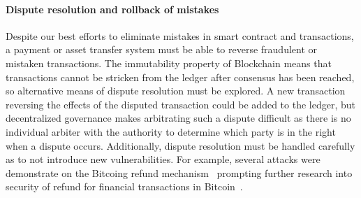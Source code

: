 
\paragraph{Dispute resolution and rollback of mistakes}
Despite our best efforts to eliminate mistakes in smart contract and transactions, a payment or asset transfer system must be able to reverse fraudulent or mistaken transactions. The immutability property of Blockchain means that transactions cannot be stricken from the ledger after consensus has been reached, so alternative means of dispute resolution must be explored. A new transaction reversing the effects of the disputed transaction could be added to the ledger, but decentralized governance makes arbitrating such a dispute difficult as there is no individual arbiter with the authority to determine which party is in the right when a dispute occurs.  Additionally, dispute resolution must be handled carefully as to not introduce new vulnerabilities.  For example, several attacks were demonstrate on the Bitcoing refund mechanism~\cite{FC:MccShaHao16} prompting further research into security of refund for financial transactions in Bitcoin~\cite{arxiv:AviSafSha18}.

